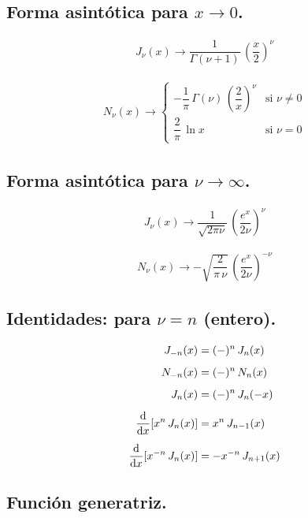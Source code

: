 \subsection{Forma asintótica para \texorpdfstring{$x \to 0$}{x -> 0}.}

\begin{align*}
J_{\nu} (x) \to \dfrac{1}{\Gamma (\nu + 1)} \, \left( \dfrac{x}{2} \right)^{\nu}
\end{align*}

\begin{align*}
N_{\nu} (x) \to 
\begin{cases}
- \dfrac{1}{\pi} \, \Gamma (\nu) \, \left( \dfrac{2}{x} \right)^{\nu} & \mbox{si } \nu \neq 0  \\[0.5em]
\dfrac{2}{\pi} \, \ln x & \mbox{si } \nu = 0 
\end{cases}
\end{align*}

\subsection{Forma asintótica para \texorpdfstring{$\nu \to \infty$}{nu to infty}.}

\begin{align*}
J_{\nu} (x) \to \dfrac{1}{\sqrt{2 \pi \nu}} \, \left( \dfrac{e^{x}}{2 \nu} \right)^{\nu}
\end{align*}

\begin{align*}
N_{\nu} (x) \to - \sqrt{\dfrac{2}{\pi \, \nu}} \, \left( \dfrac{e^{x}}{2 \nu} \right)^{- \nu}
\end{align*}

\subsection{Identidades: para \texorpdfstring{$\nu = n$}{nu = n} (entero).}

\begin{align*}
J_{-n} (x) &= (-)^{n} \, J_{n}(x) \\[0.5em]
N_{-n} (x) &= (-)^{n} \, N_{n}(x) \\[0.5em]
J_{n} (x) &= (-)^{n} \, J_{n}(-x) \\[0.5em]
\dv{x} [x^{n} \, J_{n}(x)] &=  x^{n} \, J_{n-1}(x) \\[0.5em]
\dv{x} [x^{-n} \, J_{n}(x)] &=  -x^{-n} \, J_{n+1}(x)
\end{align*}

\subsection{Función generatriz.}

